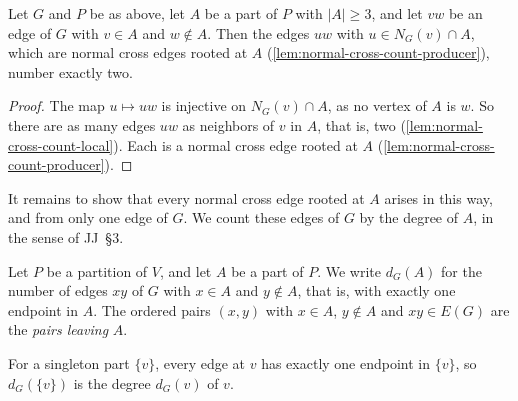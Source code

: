 \begin{lemma}
  \label{lem:normal-cross-count-fiber}
  \leanok
  Let $G$ and $P$ be as above, let $A$ be a part of $P$ with
  $|A| \ge 3$, and let $vw$ be an edge of $G$ with $v \in A$ and
  $w \notin A$. Then the edges $uw$ with $u \in N_G(v) \cap A$, which
  are normal cross edges rooted at $A$
  (\cref{lem:normal-cross-count-producer}), number exactly two.
\end{lemma}
\begin{proof}
  \leanok
  The map $u \mapsto uw$ is injective on $N_G(v) \cap A$, as no vertex of
  $A$ is $w$. So there are as many edges $uw$ as neighbors of $v$ in $A$,
  that is, two (\cref{lem:normal-cross-count-local}). Each is a normal
  cross edge rooted at $A$ (\cref{lem:normal-cross-count-producer}).
\end{proof}

It remains to show that every normal cross edge rooted at $A$ arises in
this way, and from only one edge of $G$. We count these edges of $G$ by
the degree of $A$, in the sense of JJ~\S3.

\begin{definition}
  \label{def:g-cut-edges}
  \leanok
  Let $P$ be a partition of $V$, and let $A$ be a part of $P$. We write
  $d_G(A)$ for the number of edges $xy$ of $G$ with $x \in A$ and
  $y \notin A$, that is, with exactly one endpoint in $A$. The ordered
  pairs $(x, y)$ with $x \in A$, $y \notin A$ and $xy \in E(G)$ are the
  \emph{pairs leaving} $A$.
\end{definition}

For a singleton part $\{v\}$, every edge at $v$ has exactly one endpoint
in $\{v\}$, so $d_G(\{v\})$ is the degree $d_G(v)$ of $v$.


